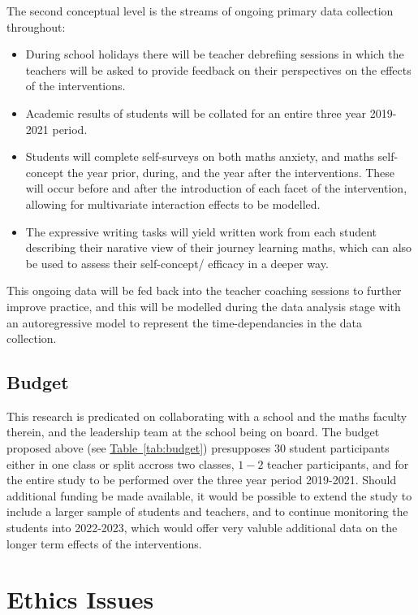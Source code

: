 \documentclass[14pt]{memoir}
\newcommand{\reftab}[1]{\hyperref[tab:#1]{Table~\ref{tab:#1}}}
\begin{document}
The second conceptual level is the streams of ongoing primary data collection throughout:
\begin{itemize}
 	\item  During school holidays there will be teacher debrefiing sessions in which the teachers will be asked to provide feedback on their perspectives on the effects of the interventions.
 	\item Academic results of students will be collated for an entire three year 2019-2021 period.
 	\item Students will complete self-surveys on both maths anxiety, and maths self-concept the year prior, during, and the year after the interventions. These will occur before and after the introduction of each facet of the intervention, allowing for multivariate interaction effects to be modelled.
 	\item The expressive writing tasks will yield written work from each student describing their narative view of their journey learning maths, which can also be used to assess their self-concept/ efficacy in a deeper way.
\end{itemize}

This ongoing data will be fed back into the teacher coaching sessions to further improve practice, and this will be modelled during the data analysis stage with an autoregressive model to represent the time-dependancies in the data collection.

\subsection*{Budget}

This research is predicated on collaborating with a school and the maths faculty therein, and the leadership team at the school being on board. The budget proposed above (see \reftab{budget}) presupposes $30$ student participants either in one class or split accross two classes, $1-2$ teacher participants, and for the entire study to be performed over the three year period 2019-2021. Should additional funding be made available, it would be possible to extend the study to include a larger sample of students and teachers, and to continue monitoring the students into 2022-2023, which would offer very valuble additional data on the longer term effects of the interventions.

\section{Ethics Issues}
\end{document}
